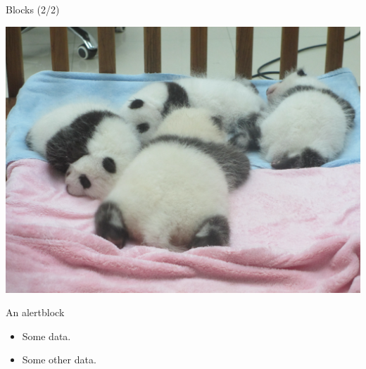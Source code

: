 \documentclass[11pt]{beamer}
\begin{document}
\begin{frame}{Blocks (2/2)}
    \begin{center}
        \includegraphics[width = .55\textwidth]{../figures/panda_puppies}
    \end{center}

    \begin{alertblock}{An alertblock}
        \begin{itemize}
            \item Some data.
            \item Some other data.
        \end{itemize}
    \end{alertblock}
\end{frame}
\end{document}
